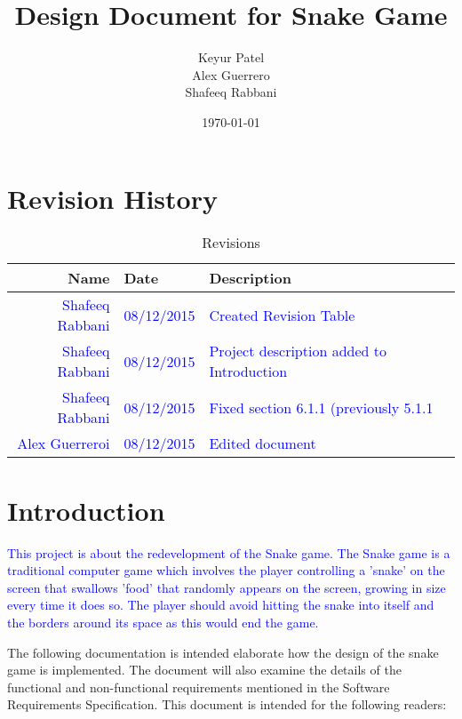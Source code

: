 \documentclass[12pt]{article}
\begin{document}
\title{Design Document for Snake Game} 
\author{Keyur Patel\\ Alex Guerrero\\ Shafeeq Rabbani}
\date{\today}
	
\maketitle

\tableofcontents

\section{Revision History}

\begin{center}
	\begin{longtable}{ | r | p{4cm} | p{10cm} | p{4cm} |}
	\caption{Revisions} \\ \hline \label{TblInputVar} 
	Name & Date & Description\\ \hline
	\textcolor{blue}{Shafeeq Rabbani} & \textcolor{blue}{08/12/2015} &  \textcolor{blue}{Created Revision Table}\\\hline
	\textcolor{blue}{Shafeeq Rabbani} & \textcolor{blue}{08/12/2015} &  \textcolor{blue}{Project description added to Introduction}\\ \hline
	\textcolor{blue}{Shafeeq Rabbani} & \textcolor{blue}{08/12/2015} &  \textcolor{blue}{Fixed section 6.1.1 (previously 5.1.1}\\ \hline
	\textcolor{blue}{Alex Guerreroi} & \textcolor{blue}{08/12/2015} &  \textcolor{blue}{Edited document}\\ \hline
	\end{longtable}
\end{center}

\section{Introduction}
\textcolor{blue}{This project is about the redevelopment of the Snake game. The Snake game is a traditional computer game which involves the player controlling a 'snake' on the screen that swallows 'food' that randomly appears on the screen, growing in size every time it does so. The player should avoid hitting the snake into itself and the borders around its space as this would end the game. }


The following documentation is intended elaborate how the design of the snake game is implemented. The document will also examine the details of the functional and non-functional requirements mentioned in the Software Requirements Specification. This document is intended for the following readers:
\end{document}

